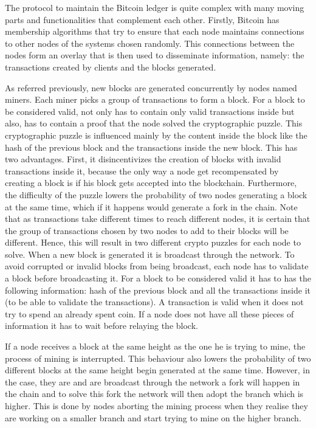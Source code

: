 \documentclass{dads}   %
\begin{document}
The protocol to maintain the Bitcoin ledger is quite complex with many moving parts and functionalities that complement each other. Firstly, Bitcoin has membership algorithms that try to ensure that each node maintains connections to other nodes of the systems chosen randomly. This connections between the nodes form an overlay that is then used to disseminate information, namely: the transactions created by clients and the blocks generated.

As referred previously, new blocks are generated concurrently by nodes named miners. Each miner picks a group of transactions to form a block. For a block to be considered valid, not only has to contain only valid transactions inside but also, has to contain a proof that the node solved the cryptographic puzzle. This cryptographic puzzle is influenced mainly by the content inside the block like the hash of the previous block and the transactions inside the new block. This has two advantages. First, it disincentivizes the creation of blocks with invalid transactions inside it, because the only way a node get recompensated by creating a block is if his block gets accepted into the blockchain. Furthermore, the difficulty of the puzzle lowers the probability of two nodes generating a block at the same time, which if it happens would generate a fork in the chain. Note that as transactions take different times to reach different nodes, it is certain that the group of transactions chosen by two nodes to add to their blocks will be different. Hence, this will result in two different crypto puzzles for each node to solve. When a new block is generated it is broadcast through the network. To avoid corrupted or invalid blocks from being broadcast, each node has to validate a block before broadcasting it. For a block to be considered valid it has to has the following information: hash of the previous block and all the transactions inside it (to be able to validate the transactions). A transaction is valid when it does not try to spend an already spent coin. If a node does not have all these pieces of information it has to wait before relaying the block.

If a node receives a block at the same height as the one he is trying to mine, the process of mining is interrupted. This behaviour also lowers the probability of two different blocks at the same height begin generated at the same time. However, in the case, they are and are broadcast through the network a fork will happen in the chain and to solve this fork the network will then adopt the branch which is higher. This is done by nodes aborting the mining process when they realise they are working on a smaller branch and start trying to mine on the higher branch.
\end{document}

